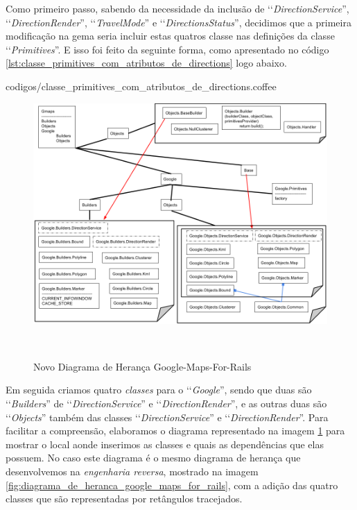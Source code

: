 Como primeiro passo, sabendo da necessidade da inclusão de ‘‘\emph{DirectionService}'',
‘‘\emph{DirectionRender}'', ‘‘\emph{TravelMode}'' e ‘‘\emph{DirectionsStatus}'', decidimos que a primeira
modificação na gema seria  incluir estas quatros classe nas definições da classe ‘‘\emph{Primitives}''.
E isso foi feito da seguinte forma, como apresentado no código
\ref{lst:classe_primitives_com_atributos_de_directions} logo abaixo.


{codigos/classe_primitives_com_atributos_de_directions.coffee}

\begin{figure}[ht]
  \begin{center}
    \includegraphics[scale=0.35]{images/novo_diagrama_de_heranca_google_maps_for_rails.png}
    \caption{Novo Diagrama de Herança Google-Maps-For-Rails}
    \label{fig:novo_diagrama_de_heranca_google_maps_for_rails}
  \end{center}  \
\end{figure}

Em seguida criamos quatro \emph{classes} para o ‘‘\emph{Google}'', sendo que duas são ‘‘\emph{Builders}'' de 
‘‘\emph{DirectionService}'' e ‘‘\emph{DirectionRender}'', e as outras duas são ‘‘\emph{Objects}'' também das 
classes ‘‘\emph{DirectionService}'' e ‘‘\emph{DirectionRender}''. Para facilitar a compreensão, elaboramos o 
diagrama representado na imagem \ref{fig:novo_diagrama_de_heranca_google_maps_for_rails} para mostrar o
local aonde inserimos as classes e quais as dependências que elas possuem. No caso este diagrama é o mesmo
diagrama de herança que desenvolvemos na \emph{engenharia reversa}, mostrado na imagem
\ref{fig:diagrama_de_heranca_google_maps_for_rails}, com a adição das quatro classes que são representadas 
por retângulos tracejados.

